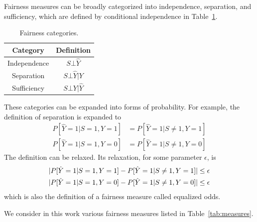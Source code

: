 \documentclass[acmsmall,sigconf]{acmart}
\DeclarePairedDelimiter{\abs}{\lvert}{\rvert}
\begin{document}
Fairness measures can be broadly categorized into independence, separation, and sufficiency, which are defined by conditional independence in Table~\ref{tab:categories}.

\begin{table}[h]
\caption{Fairness categories.}
\label{tab:categories}
\begin{tabular}{cc}
\toprule
\textbf{Category} & \textbf{Definition} \\
\midrule
Independence & $S \bot \hat{Y}$ \\
Separation & $S \bot \hat{Y} | Y$ \\
Sufficiency & $S \bot Y | \hat{Y}$ \\
\bottomrule
\end{tabular}
\end{table}

These categories can be expanded into forms of probability. For example, the definition of separation is expanded to
\begin{align*}
P[\hat{Y} = 1 | S = 1, Y = 1] & = P[\hat{Y} = 1 | S \neq 1, Y = 1] \\
P[\hat{Y} = 1 | S = 1, Y = 0] & = P[\hat{Y} = 1 | S \neq 1, Y = 0]
\end{align*}
The definition can be relaxed. Its relaxation, for some parameter $\epsilon$, is
\begin{align*}
\abs{P[\hat{Y} = 1 | S = 1, Y = 1] - P[\hat{Y} = 1 | S \neq 1, Y = 1]} & \leq \epsilon \\
\abs{P[\hat{Y} = 1 | S = 1, Y = 0] - P[\hat{Y} = 1 | S \neq 1, Y = 0]} & \leq \epsilon
\end{align*}
which is also the definition of a fairness measure called equalized odds.

We consider in this work various fairness measures listed in Table~\ref{tab:measures}.

\end{document}
